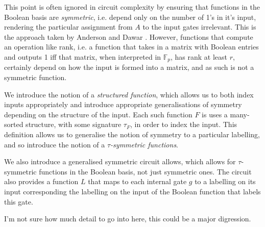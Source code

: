 \documentclass[../paper.tex]{subfiles}
\begin{document}
This point is often ignored in circuit complexity by ensuring that functions in
the Boolean basis are \emph{symmetric}, i.e. depend only on the number of 1's in
it's input, rendering the particular assignment from $A$ to the input gates
irrelevant. This is the approach taken by Anderson and Dawar \cite{AndersonD17}.
However, functions that compute an operation like rank, i.e. a function that
takes in a matrix with Boolean entries and outputs 1 iff that matrix, when
interpreted in $\mathbb{F}_p$, has rank at least $r$, certainly depend on how
the input is formed into a matrix, and as such is not a symmetric function.

We introduce the notion of a \emph{structured function}, which allows us to both
index inputs appropriately and introduce appropriate generalisations of symmetry
depending on the structure of the input. Each such function $F$ is uses a many-sorted
structure, with some signature $\tau_F$, in order to index the input. This
definition allows us to generalise the notion of symmetry to a particular
labelling, and so introduce the notion of a \emph{$\tau$-symmetric functions}.

We also introduce a generalised symmetric circuit allows, which allows for
$\tau$-symmetric functions in the Boolean basis, not just symmetric ones. The
circuit also provides a function $L$ that maps to each internal gate $g$ to a
labelling on its input corresponding the labelling on the input of the Boolean
function that labels this gate.

\begin{remark}
  I'm not sure how much detail to go into here, this could be a major
  digression.
\end{remark}






\end{document}
